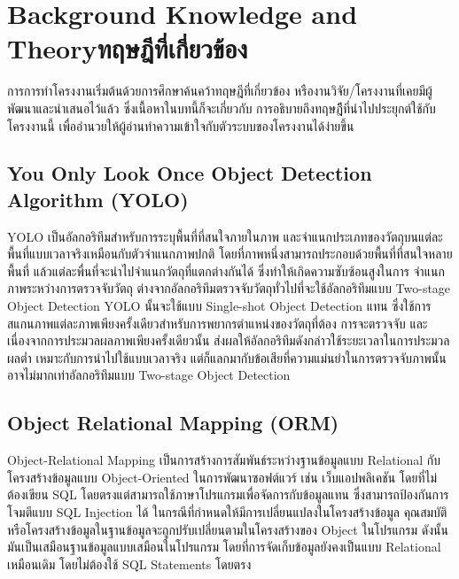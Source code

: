 \chapter{\ifenglish Background Knowledge and Theory\else ทฤษฎีที่เกี่ยวข้อง\fi}

การการทําโครงงานเริ่มต้นด้วยการศึกษาค้นคว้าทฤษฎีที่เกี่ยวข้อง หรืองานวิจัย/โครงงานที่เคยมีผู้พัฒนาและนําเสนอไว้แล้ว ซึ่งเนื้อหาในบทนี้ก็จะเกี่ยวกับ
การอธิบายถึงทฤษฎีีที่นำไปประยุกต์ใช้กับโครงงานนี้ เพื่ออำนวยให้ผู้อ่านทำความเข้าใจกับตัวระบบของโครงงานได้ง่ายขึ้น

\section{You Only Look Once Object Detection Algorithm (YOLO)}
YOLO เป็นอัลกอริทึมสำหรับการระบุพื้นที่ที่สนใจภายในภาพ และจำแนกประเภทของวัตถุบนแต่ละพื้นที่แบบเวลาจริงเหมือนกับตัวจำแนกภาพปกติ 
โดยที่ภาพหนึ่งสามารถประกอบด้วยพื้นที่ที่สนใจหลายพื้นที่ แล้วแต่ละพื่นที่จะนำไปจำแนกวัตถุที่แตกต่างกันได้ ซึ่งทำให้เกิดความซับซ้อนสูงในการ
จำแนกภาพระหว่างการตรวจจับวัตถุ ต่างจากอัลกอริทึมตรวจจับวัตถุทั่วไปที่จะใช้อัลกอริทึมแบบ Two-stage Object Detection YOLO 
นั้นจะใช้แบบ Single-shot Object Detection แทน ซึ่งใช้การสแกนภาพแต่ละภาพเพียงครั้งเดียวสำหรับการพยากรตำแหน่งของวัตถุที่ต้อง
การจะตรวจจับ และเนื่องจากการประมวลผลภาพเพียงครั้งเดียวนั้น ส่งผลให้อัลกอริทึมดังกล่าวใช้ระยะเวลาในการประมวลผลต่ำ 
เหมาะกับการนำไปใช้แบบเวลาจริง แต่ก็แลกมากับข้อเสียที่ความแม่นยำในการตรวจจับภาพนั้นอาจไม่มากเท่าอัลกอริทึมแบบ Two-stage Object Detection 

\section{Object Relational Mapping (ORM)}
Object-Relational Mapping เป็นการสร้างการสัมพันธ์ระหว่างฐานข้อมูลแบบ Relational กับโครงสร้างข้อมูลแบบ Object-Oriented 
ในการพัฒนาซอฟต์แวร์ เช่น เว็บแอปพลิเคชัน โดยที่ไม่ต้องเขียน SQL โดยตรงแต่สามารถใช้ภาษาโปรแกรมเพื่อจัดการกับข้อมูลแทน 
ซึ่งสามารถป้องกันการโจมตีแบบ SQL Injection ได้ ในกรณีที่กำหนดให้มีการเปลี่ยนแปลงในโครงสร้างข้อมูล 
คุณสมบัติหรือโครงสร้างข้อมูลในฐานข้อมูลจะถูกปรับเปลี่ยนตามในโครงสร้างของ Object ในโปรแกรม ดังนั้นมันเป็นเสมือนฐานข้อมูลแบบเสมือนในโปรแกรม 
โดยที่การจัดเก็บข้อมูลยังคงเป็นแบบ Relational เหมือนเดิม โดยไม่ต้องใช้ SQL Statements โดยตรง

